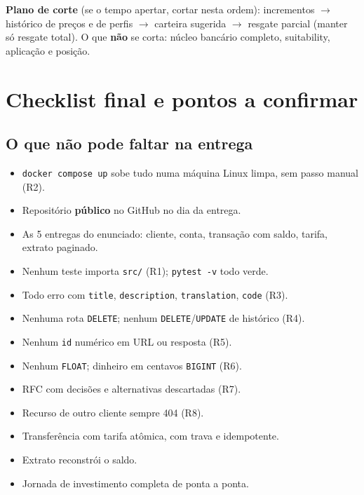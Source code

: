 \documentclass[11pt,a4paper]{article}
\newcommand{\tb}[1]{\texttt{#1}}           %
\begin{document}
\textbf{Plano de corte} (se o tempo apertar, cortar nesta ordem): incrementos $\to$ histórico de
preços e de perfis $\to$ carteira sugerida $\to$ resgate parcial (manter só resgate total). O que
\textbf{não} se corta: núcleo bancário completo, suitability, aplicação e posição.

\section{Checklist final e pontos a confirmar}\label{sec:confirmar}

\subsection{O que não pode faltar na entrega}

\begin{itemize}
  \item[$\square$] \tb{docker compose up} sobe tudo numa máquina Linux limpa, sem passo manual (R2).
  \item[$\square$] Repositório \textbf{público} no GitHub no dia da entrega.
  \item[$\square$] As 5 entregas do enunciado: cliente, conta, transação com saldo, tarifa, extrato paginado.
  \item[$\square$] Nenhum teste importa \tb{src/} (R1); \tb{pytest -v} todo verde.
  \item[$\square$] Todo erro com \tb{title}, \tb{description}, \tb{translation}, \tb{code} (R3).
  \item[$\square$] Nenhuma rota \tb{DELETE}; nenhum \tb{DELETE}/\tb{UPDATE} de histórico (R4).
  \item[$\square$] Nenhum \tb{id} numérico em URL ou resposta (R5).
  \item[$\square$] Nenhum \tb{FLOAT}; dinheiro em centavos \tb{BIGINT} (R6).
  \item[$\square$] RFC com decisões e alternativas descartadas (R7).
  \item[$\square$] Recurso de outro cliente sempre 404 (R8).
  \item[$\square$] Transferência com tarifa atômica, com trava e idempotente.
  \item[$\square$] Extrato reconstrói o saldo.
  \item[$\square$] Jornada de investimento completa de ponta a ponta.
\end{itemize}
\end{document}

